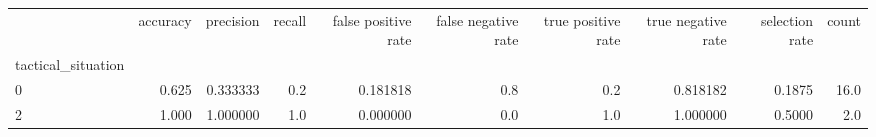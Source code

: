 \begin{tabular}{lrrrrrrrrr}
\toprule
{} &  accuracy &  precision &  recall &  false positive rate &  false negative rate &  true positive rate &  true negative rate &  selection rate &  count \\
tactical\_situation &           &            &         &                      &                      &                     &                     &                 &        \\
\midrule
0                  &     0.625 &   0.333333 &     0.2 &             0.181818 &                  0.8 &                 0.2 &            0.818182 &          0.1875 &   16.0 \\
2                  &     1.000 &   1.000000 &     1.0 &             0.000000 &                  0.0 &                 1.0 &            1.000000 &          0.5000 &    2.0 \\
\bottomrule
\end{tabular}
